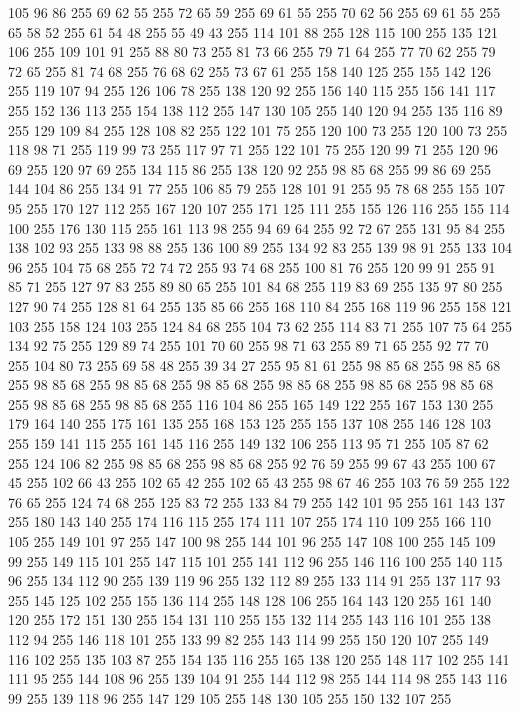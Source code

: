 105 96 86 255 69 62 55 255 72 65 59 255 69 61 55 255 70 62 56 255 69 61 55 255 65 58 52 255 61 54 48 255 55 49 43 255 114 101 88 255 128 115 100 255 135 121 106 255 109 101 91 255 88 80 73 255 81 73 66 255 79 71 64 255 77 70 62 255 79 72 65 255 81 74 68 255 76 68 62 255 73 67 61 255 158 140 125 255 155 142 126 255 119 107 94 255 126 106 78 255 138 120 92 255 156 140 115 255 156 141 117 255 152 136 113 255 154 138 112 255 147 130 105 255 140 120 94 255 135 116 89 255 129 109 84 255 128 108 82 255 122 101 75 255 120 100 73 255 120 100 73 255 118 98 71 255 119 99 73 255 117 97 71 255 122 101 75 255 120 99 71 255 120 96 69 255 120 97 69 255 134 115 86 255 138 120 92 255 98 85 68 255 99 86 69 255 144 104 86 255 134 91 77 255 106 85 79 255 128 101 91 255 95 78 68 255 155 107 95 255 170 127 112 255 167 120 107 255 171 125 111 255 155 126 116 255 155 114 100 255 176 130 115 255 161 113 98 255 94 69 64 255 92 72 67 255
131 95 84 255 138 102 93 255 133 98 88 255 136 100 89 255 134 92 83 255 139 98 91 255 133 104 96 255 104 75 68 255 72 74 72 255 93 74 68 255 100 81 76 255 120 99 91 255 91 85 71 255 127 97 83 255 89 80 65 255 101 84 68 255 119 83 69 255 135 97 80 255 127 90 74 255 128 81 64 255 135 85 66 255 168 110 84 255 168 119 96 255 158 121 103 255 158 124 103 255 124 84 68 255 104 73 62 255 114 83 71 255 107 75 64 255 134 92 75 255 129 89 74 255 101 70 60 255 98 71 63 255 89 71 65 255 92 77 70 255 104 80 73 255 69 58 48 255 39 34 27 255 95 81 61 255 98 85 68 255 98 85 68 255 98 85 68 255 98 85 68 255 98 85 68 255 98 85 68 255 98 85 68 255 98 85 68 255 98 85 68 255 98 85 68 255 116 104 86 255 165 149 122 255 167 153 130 255 179 164 140 255 175 161 135 255 168 153 125 255 155 137 108 255 146 128 103 255 159 141 115 255 161 145 116 255 149 132 106 255 113 95 71 255 105 87 62 255 124 106 82 255 98 85 68 255
98 85 68 255 92 76 59 255 99 67 43 255 100 67 45 255 102 66 43 255 102 65 42 255 102 65 43 255 98 67 46 255 103 76 59 255 122 76 65 255 124 74 68 255 125 83 72 255 133 84 79 255 142 101 95 255 161 143 137 255 180 143 140 255 174 116 115 255 174 111 107 255 174 110 109 255 166 110 105 255 149 101 97 255 147 100 98 255 144 101 96 255 147 108 100 255 145 109 99 255 149 115 101 255 147 115 101 255 141 112 96 255 146 116 100 255 140 115 96 255 134 112 90 255 139 119 96 255 132 112 89 255 133 114 91 255 137 117 93 255 145 125 102 255 155 136 114 255 148 128 106 255 164 143 120 255 161 140 120 255 172 151 130 255 154 131 110 255 155 132 114 255 143 116 101 255 138 112 94 255 146 118 101 255 133 99 82 255 143 114 99 255 150 120 107 255 149 116 102 255 135 103 87 255 154 135 116 255 165 138 120 255 148 117 102 255 141 111 95 255 144 108 96 255 139 104 91 255 144 112 98 255 144 114 98 255 143 116 99 255 139 118 96 255 147 129 105 255 148 130 105 255 150 132 107 255
